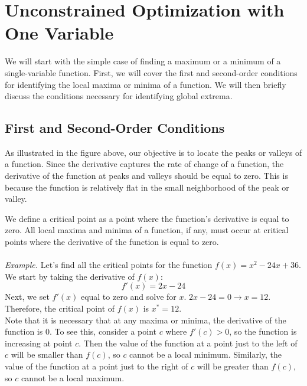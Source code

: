\documentclass{./../../latex/handout}
\begin{document}
\section{Unconstrained Optimization with One Variable}

We will start with the simple case of finding a maximum or a minimum of a single-variable function.  First, we will cover the first and second-order conditions for identifying the local maxima or minima of a function. We will then briefly discuss the conditions necessary for identifying global extrema.


\subsection{First and Second-Order Conditions}
 
As illustrated in the figure above, our objective is to locate the peaks or valleys of a function.  Since the derivative captures the rate of change of a function, the derivative of the function at peaks and valleys should be equal to zero. This is because the function is relatively flat in the small neighborhood of the peak or valley. 

We define a critical point as a point where the function's derivative is equal to zero. All local maxima and minima of a function, if any, must occur at critical points where the derivative of the function is equal to zero. \\

\\

\noindent\textit{Example.} Let's find all the critical points for the function $f(x) = x^2 -24 x + 36 $. \\
We start by taking the derivative of $f(x)$: \[f'(x) = 2x-24\]
Next, we set $f'(x)$ equal to zero and solve for $x$. $2x-24=0 \rightarrow x =12$. Therefore, the critical point of $f(x)$ is $x^* = 12$.   \\

Note that it is necessary that at any maxima or minima, the derivative of the function is 0. To see this, consider a point $c$ where $f'(c)>0$, so the function is increasing at point $c$. Then the value of the function at a point just to the left of $c$ will be smaller than $f(c)$, so $c$ cannot be a local minimum. Similarly, the value of the function at a point just to the right of $c$ will be greater than $f(c)$, so $c$ cannot be a local maximum. 
\end{document}
